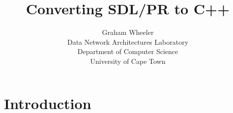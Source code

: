 
\title{Converting SDL/PR to C++}
\author{Graham Wheeler\\
Data Network Architectures Laboratory\\
Department of Computer Science\\
University of Cape Town}
\maketitle

\section{Introduction}



